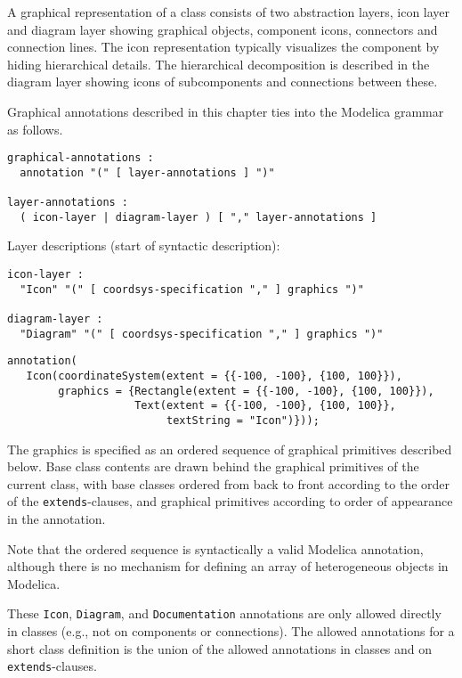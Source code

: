 A graphical representation of a class consists of two abstraction layers, icon layer and diagram layer showing graphical objects, component icons, connectors and connection lines.
The icon representation typically visualizes the component by hiding hierarchical details.
The hierarchical decomposition is described in the diagram layer showing icons of subcomponents and connections between these.

Graphical annotations described in this chapter ties into the Modelica grammar as follows.
\begin{lstlisting}[language=grammar]
graphical-annotations :
  annotation "(" [ layer-annotations ] ")"

layer-annotations :
  ( icon-layer | diagram-layer ) [ "," layer-annotations ]
\end{lstlisting}
Layer descriptions (start of syntactic description):
\begin{lstlisting}[language=grammar]
icon-layer :
  "Icon" "(" [ coordsys-specification "," ] graphics ")"

diagram-layer :
  "Diagram" "(" [ coordsys-specification "," ] graphics ")"
\end{lstlisting}%

\begin{example}
\begin{lstlisting}[language=modelica]
annotation(
   Icon(coordinateSystem(extent = {{-100, -100}, {100, 100}}),
        graphics = {Rectangle(extent = {{-100, -100}, {100, 100}}),
                    Text(extent = {{-100, -100}, {100, 100}},
                         textString = "Icon")}));
\end{lstlisting}
\end{example}

The graphics is specified as an ordered sequence of graphical primitives described below.
Base class contents are drawn behind the graphical primitives of the current class, with base classes ordered from back to front according to the order of the \lstinline!extends!-clauses, and graphical primitives according to order of appearance in the annotation.

\begin{nonnormative}
Note that the ordered sequence is syntactically a valid Modelica annotation, although there is no mechanism for defining an array of heterogeneous objects in Modelica.
\end{nonnormative}

These \lstinline!Icon!, \lstinline!Diagram!, and \lstinline!Documentation! annotations are only allowed directly in classes (e.g., not on components or connections).
The allowed annotations for a short class definition is the union of the allowed annotations in classes and on \lstinline!extends!-clauses.

